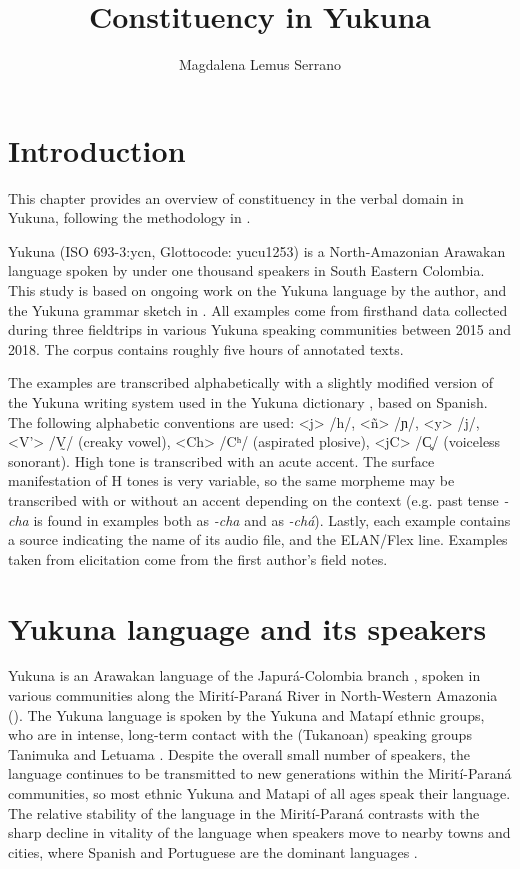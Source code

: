 \documentclass[output=paper]{langscibook}
\author{Magdalena Lemus Serrano\orcid{0000-0001-8312-6466}\affiliation{Aix-Marseille Université; Laboratoire Parole et Langage}}
\title{Constituency in Yukuna}
\begin{document}
\maketitle

\section{Introduction} %
\label{sec:yuk:introduction}

This chapter provides an overview of constituency in the verbal domain in Yukuna, following the methodology in \citet{tallmancoincidence:2020}. 

Yukuna (ISO 693-3:ycn, Glottocode: yucu1253) is a North-Amazonian Arawak\-an language spoken by under one thousand speakers in South Eastern Colombia. This study is based on ongoing work on the Yukuna language by the author, and the Yukuna grammar sketch in \citet{lemus2020}. All examples come from firsthand data collected during three fieldtrips in various Yukuna speaking communities between 2015 and 2018. The corpus contains roughly five hours of annotated texts.

The examples are transcribed alphabetically with a slightly modified version of the Yukuna writing system used in the Yukuna dictionary \citep{schauer_meke_2005}, based on Spanish. The following alphabetic conventions are used: <j> /h/, <ñ> /ɲ/, <y> /j/, <V'> /V̰/ (creaky vowel), <Ch> /Cʰ/ (aspirated plosive), <jC> /C̥/ (voiceless sonorant). High tone is transcribed with an acute accent. The surface manifestation of H tones is very variable, so the same morpheme may be transcribed with or without an accent depending on the context (e.g. past tense \textit{-cha} is found in examples both as \textit{-cha} and as \textit{-chá}). Lastly, each example contains a source indicating the name of its audio file, and the ELAN/Flex line. Examples taken from elicitation come from the first author's field notes.


\section{Yukuna language and its speakers} %
\label{sec:lang}

Yukuna is an Arawakan language of the Japurá-Colombia branch
\citep{ramirez2001}, spoken in various communities along the Mirití-Paraná River in North-Western Amazonia  ().
The Yukuna language is spoken by the Yukuna and Matapí ethnic groups, who are in intense, long-term contact with the (Tukanoan) speaking groups Tanimuka and Letuama \citep[][57]{fontaine2001}. Despite the overall small number of speakers, the language continues to be transmitted to new generations within the Mirití-Paraná communities, so most ethnic Yukuna and Matapi of all ages speak their language. The relative stability of the language in the Mirití-Paraná contrasts with the sharp decline in vitality of the language when speakers move to nearby towns and cities, where Spanish and Portuguese are the dominant languages \citep[][24]{lemus2016}. 
\end{document}
